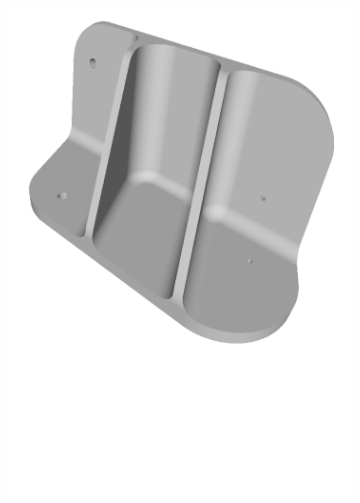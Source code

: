 \begin{figure}[h!]
{\begin{tcolorbox}
\begin{subfigure}[c]{.23\textwidth}
         \includegraphics[trim={0cm 9cm 0cm 0cm},clip,width=1\linewidth,angle=0]{Cap5/Figuras/objects/reinforced_bracket.pdf}
         \caption{}
         \label{fig:reinforced_bracket}
      \end{subfigure}
      \hfill
      \begin{subfigure}[c]{.23\textwidth}
         \centering

\end{subfigure}
\end{tcolorbox}}
\end{figure}
